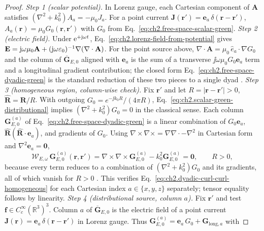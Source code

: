 \begin{proof}
\emph{Step 1 (scalar potential).} In Lorenz gauge, each Cartesian component of $\mathbf{A}$ satisfies $(\nabla^{2}+k_0^{2})A_a=-\mu_0 J_a$.
For a point current $\mathbf{J}(\mathbf{r}')=\mathbf{e}_a\,\delta(\mathbf{r}-\mathbf{r}')$, $A_a(\mathbf{r})=\mu_0 G_0(\mathbf{r},\mathbf{r}')$ with $G_0$ from Eq.~\eqref{eq:ch2.free-space-scalar-green}.
\emph{Step 2 (electric field).} Under $\mathrm{e}^{+\mathrm{j}\omega t}$, Eq.~\eqref{eq:ch2.lorenz-field-from-potential} gives
$\mathbf{E}=\mathrm{j}\omega\mu_0\mathbf{A}+(\mathrm{j}\omega\varepsilon_0)^{-1}\nabla(\nabla\cdot\mathbf{A})$.
For the point source above, $\nabla\cdot\mathbf{A}=\mu_0\,\hat{e}_a\cdot\nabla G_0$ and the column of $\overline{\mathbf{G}}_{E,0}$ aligned with $\mathbf{e}_a$ is the sum of a transverse $\jj\omega\mu_0 G_0\mathbf{e}_a$ term and a longitudinal gradient contribution; the closed form Eq.~\eqref{eq:ch2.free-space-dyadic-green} is the standard reduction of these two pieces to a single dyad \cite{tai1994,stratton1941}.
\emph{Step 3 (homogeneous region, column-wise check).} Fix $\mathbf{r}'$ and let $R=|\mathbf{r}-\mathbf{r}'|>0$, $\widehat{\mathbf{R}}=\mathbf{R}/R$.
With outgoing $G_0=e^{-\jj k_0 R}/(4\pi R)$, Eq.~\eqref{eq:ch2.scalar-green-distributional} implies $(\nabla^{2}+k_0^{2})G_0=0$ in the classical sense.
Each column $\mathbf{G}_{E,0}^{(a)}$ of Eq.~\eqref{eq:ch2.free-space-dyadic-green} is a linear combination of $G_0\mathbf{e}_a$, $\widehat{\mathbf{R}}(\widehat{\mathbf{R}}\cdot\mathbf{e}_a)$, and gradients of $G_0$.
Using $\nabla\times\nabla\times=\nabla\nabla\cdot-\nabla^{2}$ in Cartesian form and $\nabla^{2}\mathbf{e}_a=\mathbf{0}$,
\begin{equation}
\label{eq:ch2.column-curl-curl-check}
\mathcal{W}_{E,\omega}\,\mathbf{G}_{E,0}^{(a)}(\mathbf{r},\mathbf{r}')
=
\nabla\times\nabla\times\mathbf{G}_{E,0}^{(a)}-k_0^{2}\mathbf{G}_{E,0}^{(a)}
=\mathbf{0},
\qquad R>0,
\end{equation}
because every term reduces to a combination of $(\nabla^{2}+k_0^{2})G_0$ and its gradients, all of which vanish for $R>0$ \cite{tai1994,stratton1941}.
This verifies Eq.~\eqref{eq:ch2.dyadic-curl-curl-homogeneous} for each Cartesian index $a\in\{x,y,z\}$ separately; tensor equality follows by linearity.
\emph{Step 4 (distributional source, column $a$).} Fix $\mathbf{r}'$ and test $\mathbf{f}\in C_c^{\infty}(\mathbb{R}^{3})^{3}$.
Column $a$ of $\overline{\mathbf{G}}_{E,0}$ is the electric field of a point current
$\mathbf{J}(\mathbf{r})=\mathbf{e}_a\,\delta(\mathbf{r}-\mathbf{r}')$ in Lorenz gauge.
Thus $\mathbf{G}_{E,0}^{(a)}=\mathbf{e}_a\,G_0+\mathbf{G}_{\mathrm{long},a}$ with

\end{proof}
